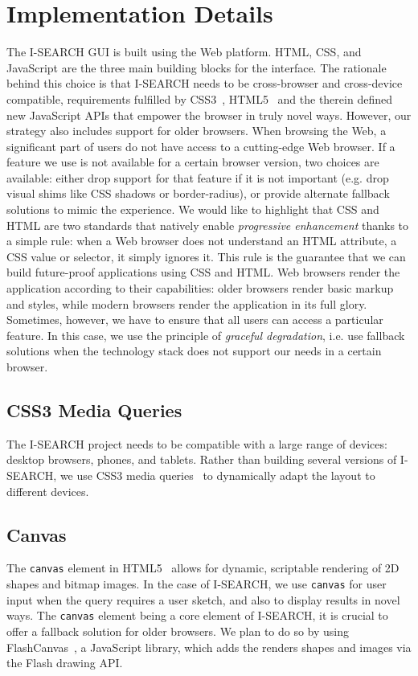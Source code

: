 \documentclass[runningheads,a4paper]{llncs} \usepackage[utf8]{inputenc}
\begin{document}
\section{Implementation Details}
The \mbox{I-SEARCH} GUI is built using the Web platform. HTML, CSS, and Java\-Script are the three main building blocks for the interface. The rationale behind this choice is that \mbox{I-SEARCH} needs to be cross-browser and cross-device compatible, requirements fulfilled by CSS3~\cite{css3}, HTML5~\cite{html5} and the therein defined new JavaScript APIs that empower the browser in truly novel ways. However, our strategy also includes support for older browsers. When browsing the Web, a significant part of users do not have access to a cutting-edge Web browser. If a feature we use is not available for a certain browser version, two choices are available: either drop support for that feature if it is not important (e.g. drop visual shims like CSS shadows or border-radius), or provide alternate fallback solutions to mimic the experience. We would like to highlight that CSS and HTML are two standards that natively enable \emph{progressive enhancement} thanks to a simple rule: when a Web browser does not understand an HTML attribute, a CSS value or selector, it simply ignores it. This rule is the guarantee that we can build future-proof applications using CSS and HTML. Web browsers render the application according to their capabilities: older browsers render basic markup and styles, while modern browsers render the application in its full glory. Sometimes, however, we have to ensure that all users can access a particular feature. In this case, we use the principle of \emph{graceful degradation}, i.e. use fallback solutions when the technology stack does not support our needs in a certain browser.

\subsection{CSS3 Media Queries} 
The \mbox{I-SEARCH} project needs to be compatible with a large range of devices: desktop browsers, phones, and tablets. Rather than building several versions of \mbox{I-SEARCH}, we use CSS3 media queries~\cite{css3} to dynamically adapt the layout to different devices. 

\subsection{Canvas}
The \texttt{canvas} element in HTML5~\cite{html5} allows for dynamic, scriptable rendering of 2D shapes and bitmap images. In the case of \mbox{I-SEARCH}, we use \texttt{canvas} for user input when the query requires a user sketch, and also to display results in novel ways. The \texttt{canvas} element being a core element of \mbox{I-SEARCH}, it is crucial to offer a fallback solution for older browsers. We plan to do so by using FlashCanvas~\cite{flashcanvas}, a JavaScript library, which adds the renders shapes and images via the Flash drawing API.
\end{document}
